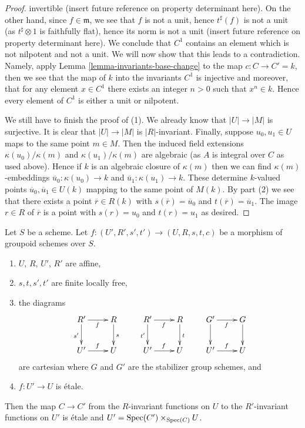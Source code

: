 \begin{proof}
invertible (insert future reference on property determinant here).
On the other hand, since $f \in \mathfrak m$, we see that
$f$ is not a unit, hence $t^\sharp(f)$ is not a unit
(as $t^\sharp \otimes 1$ is faithfully flat),
hence its norm is not a unit (insert future reference
on property determinant here). We conclude that $C^1$ contains
an element which is not nilpotent
and not a unit. We will now show that this leads to a contradiction.
Namely, apply Lemma \ref{lemma-invariants-base-change}
to the map $c : C \to C' = k$, then
we see that the map of $k$ into the invariants $C^1$ is injective
and moreover, that for any element $x \in C^1$ there exists an integer
$n > 0$ such that $x^n \in k$. Hence every element of $C^1$ is
either a unit or nilpotent.

\medskip\noindent
We still have to finish the proof of (1). We already know that
$|U| \to |M|$ is surjective. It is clear that $|U| \to |M|$ is
$|R|$-invariant. Finally, suppose $u_0, u_1 \in U$ maps to the same
point $m \in M$. Then the induced field extensions $\kappa(u_0)/\kappa(m)$
and $\kappa(u_1)/\kappa(m)$ are algebraic (as $A$ is integral over $C$
as used above). Hence if $k$ is an algebraic closure of $\kappa(m)$
then we can find $\kappa(m)$-embeddings $\overline{u}_0 : \kappa(u_0) \to k$
and $\overline{u}_1 : \kappa(u_1) \to k$. These determine $k$-valued
points $\overline{u}_0, \overline{u}_1 \in U(k)$ mapping to the same
point of $M(k)$. By part (2) we see that there exists a point
$\overline{r} \in R(k)$ with $s(\overline{r}) = \overline{u}_0$ and
$t(\overline{r}) = \overline{u}_1$. The image $r \in R$ of $\overline{r}$
is a point with $s(r) = u_0$ and $t(r) = u_1$ as desired.
\end{proof}

\begin{lemma}
\label{lemma-etale}
Let $S$ be a scheme. Let $f : (U', R', s', t') \to (U, R, s, t, c)$ be a
morphism of groupoid schemes over $S$.
\begin{enumerate}
\item $U$, $R$, $U'$, $R'$ are affine,
\item $s, t, s', t'$ are finite locally free,
\item the diagrams
$$
\xymatrix{
R' \ar[d]_{s'} \ar[r]_f & R \ar[d]^s \\
U' \ar[r]^f & U
}
\quad
\quad
\xymatrix{
R' \ar[d]_{t'} \ar[r]_f & R \ar[d]^t \\
U' \ar[r]^f & U
}
\quad
\quad
\xymatrix{
G' \ar[d] \ar[r]_f & G \ar[d] \\
U' \ar[r]^f & U
}
$$
are cartesian where $G$ and $G'$ are the stabilizer group schemes, and
\item $f : U' \to U$ is \'etale.
\end{enumerate}
Then the map $C \to C'$ from the $R$-invariant functions on $U$
to the $R'$-invariant functions on $U'$ is \'etale and
$U' = \mathop{\mathrm{Spec}}(C') \times_{\mathop{\mathrm{Spec}}(C)} U$.
\end{lemma}

